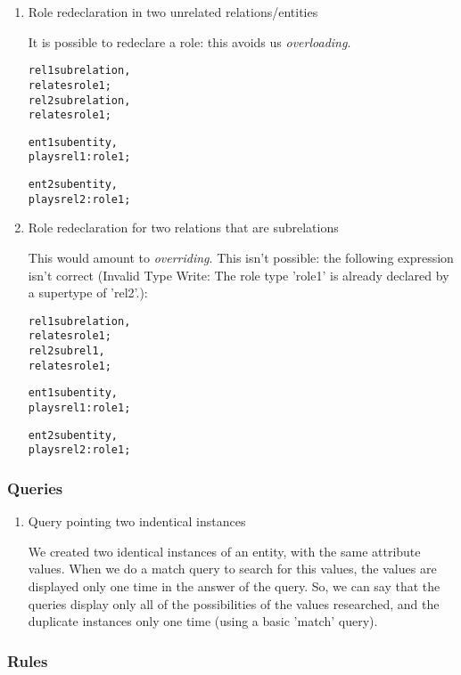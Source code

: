\documentclass{article}
\begin{document}
\begin{enumerate}
\item Role redeclaration in two unrelated relations/entities

It is possible to redeclare a role: this avoids us \emph{overloading}.

  \begin{alltt}
rel1 sub relation,
     relates role1;
rel2 sub relation,
     relates role1;

ent1 sub entity,
  plays rel1:role1;

ent2 sub entity,
  plays rel2:role1;
  \end{alltt}
 
\item Role redeclaration for two relations that are subrelations

This would amount to \emph{overriding}. This isn't possible: the following expression isn't correct (Invalid Type Write: The role type 'role1' is already declared by a supertype of 'rel2'.): 
  
  \begin{alltt}
rel1 sub relation,
     relates role1;
rel2 sub rel1,
     relates role1;

ent1 sub entity,
  plays rel1:role1;

ent2 sub entity,
  plays rel2:role1;
  \end{alltt}
  

\end{enumerate}

\subsubsection{Queries}

\begin{enumerate}
\item Query pointing two indentical instances

We created two identical instances of an entity, with the same attribute values. When we do a match query to search for this values, the values are displayed only one time in the answer of the query.
So, we can say that the queries display only all of the possibilities of the values researched, and the duplicate instances only one time (using a basic 'match' query).



\end{enumerate}

\subsubsection{Rules}
\end{document}
